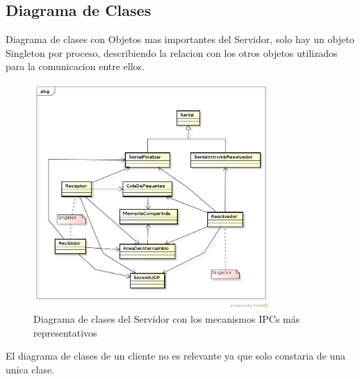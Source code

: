 \documentclass[a4paper,12pt,titlepage]{article}
\begin{document}
\subsection{Diagrama de Clases}
Diagrama de clases con Objetos mas importantes del Servidor, solo hay un objeto Singleton por proceso, describiendo la relacion con los otros objetos utilizados para la comunicacion entre ellos. 
\begin{figure}[h!]
\centering
\includegraphics[width=0.8\textwidth]{dia_clases-servidor.png}
\caption{Diagrama de clases del Servidor con los mecanismos IPCs más representativos}
\label{fig:clases}
\end{figure}

El diagrama de clases de un cliente no es relevante ya que solo constaria de una unica clase.
\end{document}

